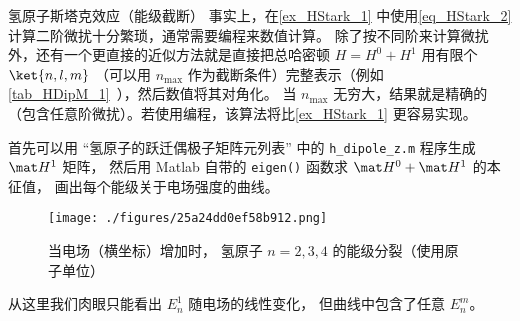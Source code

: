 \begin{example}{氢原子斯塔克效应（能级截断）}\label{ex_HStark_2}
事实上，在\autoref{ex_HStark_1} 中使用\autoref{eq_HStark_2} 计算二阶微扰十分繁琐，通常需要编程来数值计算。 除了按不同阶来计算微扰外，还有一个更直接的近似方法就是直接把总哈密顿 $H = H^0+H^1$ 用有限个 $\ket{n,l,m}$ （可以用 $n_\text{max}$ 作为截断条件）完整表示（例如\autoref{tab_HDipM_1}~），然后数值将其对角化。 当 $n_\text{max}$ 无穷大，结果就是精确的（包含任意阶微扰）。若使用编程，该算法将比\autoref{ex_HStark_1} 更容易实现。

首先可以用 “氢原子的跃迁偶极子矩阵元列表” 中的 \verb`h_dipole_z.m` 程序生成 $\mat H^1$ 矩阵， 然后用 Matlab 自带的 \verb`eigen()` 函数求 $\mat H^0+\mat H^1$ 的本征值， 画出每个能级关于电场强度的曲线。
\begin{figure}[ht]
\centering
\texttt{[image: ./figures/25a24dd0ef58b912.png]}
\caption{当电场（横坐标）增加时， 氢原子 $n=2,3,4$ 的能级分裂（使用原子单位）} \label{fig_HStark_2}
\end{figure}
从这里我们肉眼只能看出 $E_n^1$ 随电场的线性变化， 但曲线中包含了任意 $E_n^m$。
\end{example}


